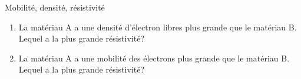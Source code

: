 \documentclass{beamer}
\begin{document}
\begin{frame}{Mobilité, densité, résistivité}
\begin{enumerate}
  \item La matériau A a une densité d'électron libres plus grande que le
    matériau B.  Lequel a la plus grande résistivité?
  \item La matériau A a une mobilité des électrons plus grande que le
    matériau B.  Lequel a la plus grande résistivité?
\end{enumerate}
\end{frame}
\end{document}
